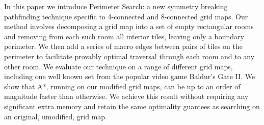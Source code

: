 In this paper we introduce Perimeter Search: a new symmetry breaking 
pathfinding technique specific to 4-connected and 8-connected grid maps.
Our method involves decomposing a grid map into a set of empty rectangular rooms
and removing from each such room all interior tiles, leaving only a boundary perimeter.
We then add a series of macro edges between pairs of tiles on the perimeter to facilitate
provably optimal traversal through each room and to any other room.
We evaluate our technique on a range of different grid maps, including one well known set from
the popular video game Baldur's Gate II.
We show that A*, running on our modified grid maps, can be up to an order of magnitude faster
than otherwise. 
We achieve this result without requiring any significant extra memory and retain the same 
optimality guantees as searching on an original, umodified, grid map.

